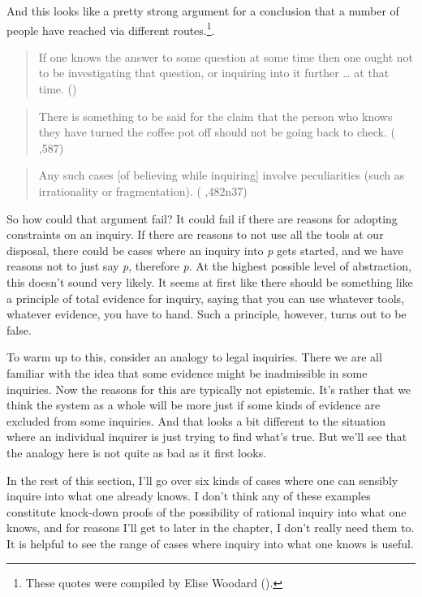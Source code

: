 \documentclass[
  12pt,
  letterpaper,
]{scrbook}
\begin{document}
And this looks like a pretty strong argument for a conclusion that a
number of people have reached via different routes.\footnote{These
  quotes were compiled by Elise Woodard
  ().}.

\begin{quote}
If one knows the answer to some question at some time then one ought not
to be investigating that question, or inquiring into it further \ldots{}
at that time. ()
\end{quote}

\begin{quote}
There is something to be said for the claim that the person who knows
they have turned the coffee pot off should not be going back to check.
( ,587)
\end{quote}

\begin{quote}
Any such cases {[}of believing while inquiring{]} involve peculiarities
(such as irrationality or fragmentation).
( ,482n37)
\end{quote}

So how could that argument fail? It could fail if there are reasons for
adopting constraints on an inquiry. If there are reasons to not use all
the tools at our disposal, there could be cases where an inquiry into
\emph{p} gets started, and we have reasons not to just say \emph{p},
therefore \emph{p}. At the highest possible level of abstraction, this
doesn't sound very likely. It seems at first like there should be
something like a principle of total evidence for inquiry, saying that
you can use whatever tools, whatever evidence, you have to hand. Such a
principle, however, turns out to be false.

To warm up to this, consider an analogy to legal inquiries. There we are
all familiar with the idea that some evidence might be inadmissible in
some inquiries. Now the reasons for this are typically not epistemic.
It's rather that we think the system as a whole will be more just if
some kinds of evidence are excluded from some inquiries. And that looks
a bit different to the situation where an individual inquirer is just
trying to find what's true. But we'll see that the analogy here is not
quite as bad as it first looks.

In the rest of this section, I'll go over six kinds of cases where one
can sensibly inquire into what one already knows. I don't think any of
these examples constitute knock-down proofs of the possibility of
rational inquiry into what one knows, and for reasons I'll get to later
in the chapter, I don't really need them to. It is helpful to see the
range of cases where inquiry into what one knows is useful.
\end{document}
